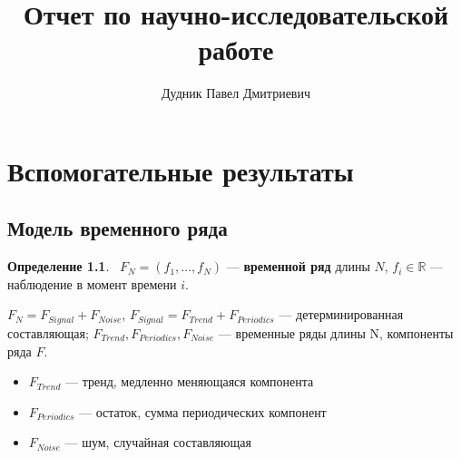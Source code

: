 \documentclass[specialist, substylefile = spbureport.rtx, subf,href,colorlinks=true, 12pt]{disser}
\theoremstyle{definition}
\newtheorem{definition}{Определение}
\begin{document}
%
%

\title{Отчет по научно-исследовательской работе}


\author{Дудник Павел Дмитриевич}


\date{\number\year}

\chapter{Вспомогательные результаты}
\label{ch:1}
\section{Модель временного ряда}
\begin{definition}
    ~$F_N = (f_1, \ldots, f_N)$ --- \textbf{временной ряд} длины $N$, $f_i \in \mathbb{R}$ --- наблюдение в момент времени $i$.

    $F_N = F_{Signal} + F_{Noise}$, $F_{Signal} = F_{Trend} + F_{Periodics}$ --- детерминированная составляющая; $F_{Trend}, F_{Periodics}, F_{Noise}$ --- временные ряды длины N, компоненты ряда $F$.
    \begin{itemize}
        \item $F_{Trend}$ --- тренд, медленно меняющаяся компонента
        \item $F_{Periodics}$ --- остаток, сумма периодических компонент
        \item $F_{Noise}$ --- шум, случайная составляющая
    \end{itemize}
\end{definition}
\end{document}
